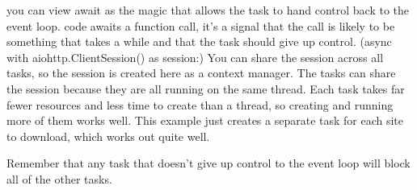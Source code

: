  you can view await as the magic that allows the task to hand control back to the event loop.  code awaits a function call, it's a signal that the call is likely to be something that takes a while and that the task should give up control.
(async with aiohttp.ClientSession() as session:) You can share the session across all tasks, so the session is created here as a context manager. The tasks can share the session because they are all running on the same thread. Each task takes far fewer resources and less time to create than a thread, so creating and running more of them works well. This example just creates a separate task for each site to download, which works out quite well.

 Remember that any task that doesn't give up control to the event loop will block all of the other tasks.
 
 
 
